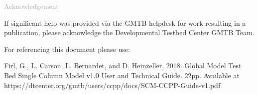 \begin{titlepage}
\vspace*{0.5cm}
\noindent

\begin{flushleft}
\textcolor{darkgray}{\LARGE Acknowledgement}
\vspace*{1cm}\par

If significant help was provided via the GMTB helpdesk for work resulting in a publication, please acknowledge the Developmental Testbed Center GMTB Team.\\
\vspace*{1cm}\par
For referencing this document please use:\\ 
\vspace*{1cm}\par
Firl, G., L. Carson, L. Bernardet, and D. Heinzeller, 2018. Global Model Test Bed Single Column Model v1.0 User and Technical Guide. 22pp. Available at https://dtcenter.org/gmtb/users/ccpp/docs/SCM-CCPP-Guide-v1.pdf

\end{flushleft}
\end{titlepage}
\pagebreak{}




